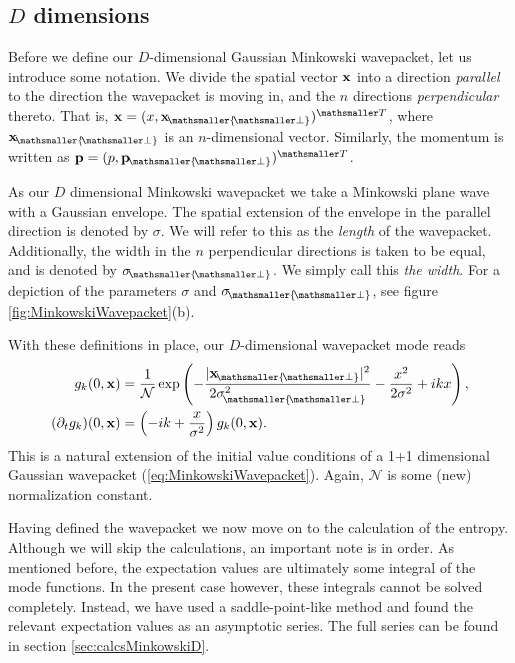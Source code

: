 \documentclass[11pt, a4paper]{article}
\def\bx{{\bf x}}
\def\bp{{\bf p}}
\newcommand{\si}{{\sigma}}
\newcommand{\del}{{\partial}}
\newcommand{\mc}[1]{\mathcal{#1}}
\let\perptmp\perp
\renewcommand{\perp}{{\! \mathsmaller{\perptmp}}}
\newcommand{\ms}{\mathsmaller}
\begin{document}
\subsection{$D$ dimensions}
Before we define our $D$-dimensional Gaussian Minkowski wavepacket, let us introduce some notation. We divide the spatial vector $\bx$ into a direction \emph{parallel} to the direction the wavepacket is moving in, and the $n$ directions \emph{perpendicular} thereto. That is, $\bx=(x,\bx_\perp)^{\ms T}$, where $\bx_\perp$ is an $n$-dimensional vector. Similarly, the momentum is written as $\bp=(p ,\bp_\perp)^{\ms T}$. 

As our $D$ dimensional  Minkowski wavepacket we take a Minkowski plane wave with a Gaussian envelope. The spatial extension of the envelope in the parallel direction is denoted by $\si$. We will refer to this as the \emph{length} of the wavepacket. Additionally, the width in the $n$ perpendicular directions is taken to be equal, and is denoted by $\si_\perp$. We simply call this \emph{the width}. For a depiction of the parameters $\si$ and $\si_\perp$, see figure \ref{fig:MinkowskiWavepacket}(b). 

With these definitions in place, our $D$-dimensional wavepacket mode reads 
\begin{align}
	\label{eq:initialValueConditionsOfDDimensionalMinkowsiWavepacket}
	\begin{aligned}
g_k(0,\bx)&=\frac{1}{\mc N}\exp\left(-\frac{|\bx_\perp|^2}{2\si_\perp^2}-\frac{x ^2}{2\si ^2}+i  k  x \right),\\
(\del_t g_k)(0,\bx)&=\left(-i  k +\frac{x }{\si ^2}\right) g_k(0,\bx).
\end{aligned}
\end{align}
This is a natural extension of the initial value conditions of a 1+1 dimensional Gaussian wavepacket (\ref{eq:MinkowskiWavepacket}). Again, $\mc N$ is some (new) normalization constant. 


Having defined the wavepacket we now move on to the calculation of the entropy. Although we will skip the calculations, an important note is in order. As mentioned before, the expectation values are ultimately some integral of the mode functions. In the present case however, these integrals cannot be solved completely. Instead, we have used a saddle-point-like method and found the relevant expectation values as an asymptotic series. The full series can be found in section \ref{sec:calcsMinkowskiD}.
\end{document}
